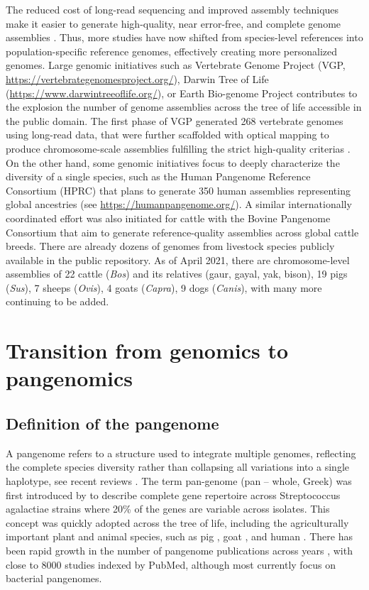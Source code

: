 \documentclass[../main.tex]{subfiles}
\begin{document}
The reduced cost of long-read sequencing and improved assembly techniques  make it easier to generate high-quality, near error-free, and complete genome assemblies \citep{miga2020telomere,logsdon2021structure}. Thus, more studies have now shifted from species-level references into population-specific reference genomes, effectively creating more personalized genomes. Large genomic initiatives such as Vertebrate Genome Project (VGP, \url{https://vertebrategenomesproject.org/}), Darwin Tree of Life (\url{https://www.darwintreeoflife.org/}), or Earth Bio-genome Project \citep{lewin2018earth} contributes to the explosion the number of genome assemblies across the tree of life accessible in the public domain. The first phase of VGP generated 268 vertebrate genomes using long-read data, that were further scaffolded with optical mapping to produce chromosome-scale assemblies fulfilling the strict high-quality criterias \citep{Rhie2021}. On the other hand, some genomic initiatives focus to deeply characterize the diversity of a single species, such as the Human Pangenome Reference Consortium (HPRC) that plans to generate 350 human assemblies representing global ancestries (see \url{https://humanpangenome.org/}). A similar internationally coordinated effort was also initiated for cattle with the Bovine Pangenome Consortium \citep{heaton2021reference} that aim to generate reference-quality assemblies across global cattle breeds. There are already dozens of genomes from livestock species publicly available in the public repository. As of April 2021, there are chromosome-level assemblies of 22 cattle (\emph{Bos}) and its relatives (gaur, gayal, yak, bison), 19 pigs (\emph{Sus}), 7 sheeps (\emph{Ovis}), 4 goats (\emph{Capra}), 9 dogs (\emph{Canis}), with many more continuing to be added.

\section{Transition from genomics to pangenomics}

\subsection{Definition of the pangenome}

A pangenome refers to a structure used to  integrate multiple genomes, reflecting the complete species diversity rather than collapsing all variations into a single haplotype, see recent reviews \citep{bayer2020plant,sherman2020pan,della2021pan}. The term pan-genome (pan – whole, Greek) was first introduced by \citet{tettelin2005genome} to describe complete gene repertoire across Streptococcus agalactiae strains where 20\% of the genes are variable across isolates. This concept was quickly adopted across the tree of life, including the agriculturally important plant and animal species, such as pig \citep{li2017comprehensive,tian2019building}, goat \citep{li2019towards}, and human \citep{duan2019hupan,sherman2019assembly}. There has been rapid growth in the number of pangenome publications across years \citep{bayer2020plant}, with close to 8000 studies indexed by PubMed,  although most currently focus on bacterial pangenomes.  
\end{document}
